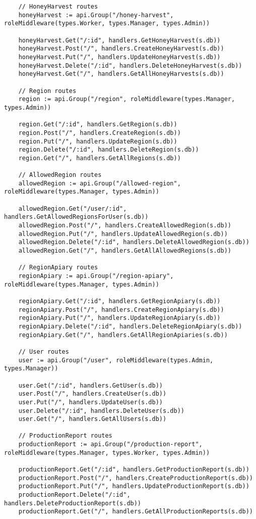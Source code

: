 \documentclass{article}
\begin{document}
\begin{lstlisting}
	// HoneyHarvest routes
	honeyHarvest := api.Group("/honey-harvest", roleMiddleware(types.Worker, types.Manager, types.Admin))

	honeyHarvest.Get("/:id", handlers.GetHoneyHarvest(s.db))
	honeyHarvest.Post("/", handlers.CreateHoneyHarvest(s.db))
	honeyHarvest.Put("/", handlers.UpdateHoneyHarvest(s.db))
	honeyHarvest.Delete("/:id", handlers.DeleteHoneyHarvest(s.db))
	honeyHarvest.Get("/", handlers.GetAllHoneyHarvests(s.db))

	// Region routes
	region := api.Group("/region", roleMiddleware(types.Manager, types.Admin))

	region.Get("/:id", handlers.GetRegion(s.db))
	region.Post("/", handlers.CreateRegion(s.db))
	region.Put("/", handlers.UpdateRegion(s.db))
	region.Delete("/:id", handlers.DeleteRegion(s.db))
	region.Get("/", handlers.GetAllRegions(s.db))

	// AllowedRegion routes
	allowedRegion := api.Group("/allowed-region", roleMiddleware(types.Manager, types.Admin))

	allowedRegion.Get("/user/:id", handlers.GetAllowedRegionsForUser(s.db))
	allowedRegion.Post("/", handlers.CreateAllowedRegion(s.db))
	allowedRegion.Put("/", handlers.UpdateAllowedRegion(s.db))
	allowedRegion.Delete("/:id", handlers.DeleteAllowedRegion(s.db))
	allowedRegion.Get("/", handlers.GetAllAllowedRegions(s.db))

	// RegionApiary routes
	regionApiary := api.Group("/region-apiary", roleMiddleware(types.Manager, types.Admin))

	regionApiary.Get("/:id", handlers.GetRegionApiary(s.db))
	regionApiary.Post("/", handlers.CreateRegionApiary(s.db))
	regionApiary.Put("/", handlers.UpdateRegionApiary(s.db))
	regionApiary.Delete("/:id", handlers.DeleteRegionApiary(s.db))
	regionApiary.Get("/", handlers.GetAllRegionApiaries(s.db))

	// User routes
	user := api.Group("/user", roleMiddleware(types.Admin, types.Manager))

	user.Get("/:id", handlers.GetUser(s.db))
	user.Post("/", handlers.CreateUser(s.db))
	user.Put("/", handlers.UpdateUser(s.db))
	user.Delete("/:id", handlers.DeleteUser(s.db))
	user.Get("/", handlers.GetAllUsers(s.db))

	// ProductionReport routes
	productionReport := api.Group("/production-report", roleMiddleware(types.Manager, types.Worker, types.Admin))

	productionReport.Get("/:id", handlers.GetProductionReport(s.db))
	productionReport.Post("/", handlers.CreateProductionReport(s.db))
	productionReport.Put("/", handlers.UpdateProductionReport(s.db))
	productionReport.Delete("/:id", handlers.DeleteProductionReport(s.db))
	productionReport.Get("/", handlers.GetAllProductionReports(s.db))


\end{lstlisting}
\end{document}
